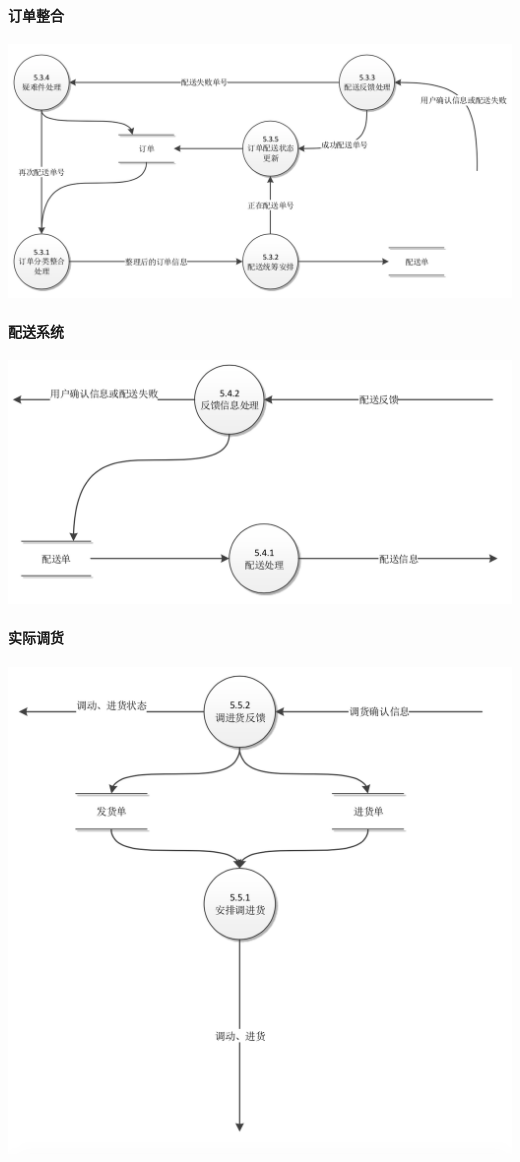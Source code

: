\paragraph{订单整合}
\includegraphics{img/5.3.png}
\paragraph{配送系统}
\includegraphics{img/5.4.png}
\paragraph{实际调货}
\includegraphics{img/5.5.png}
